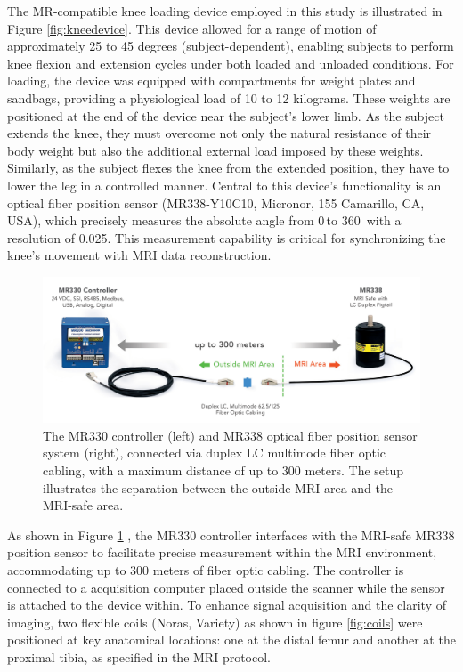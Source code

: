 \documentclass{micro-econ-thesis}
\begin{document}
The MR-compatible knee loading device employed in this study is illustrated in Figure \ref{fig:kneedevice}. This device allowed for a range of motion of approximately 25 to 45 degrees (subject-dependent), enabling subjects to perform knee flexion and extension cycles under both loaded and unloaded conditions. For loading, the device was equipped with compartments for weight plates and sandbags, providing a physiological load of 10 to 12 kilograms. These weights are positioned at the end of the device near the subject's lower limb. As the subject extends the knee, they must overcome not only the natural resistance of their body weight but also the additional external load imposed by these weights. Similarly, as the subject flexes the knee from the extended position, they have to lower the leg in a controlled manner. Central to this device's functionality is an optical fiber position sensor (MR338-Y10C10, Micronor, 155 Camarillo, CA, USA), which precisely  measures the ab­solute angle from 0{\degree}\,to 360\degree \, with a resolution of 0.025\degree \parencite{rickenbach_optical_2013}. This measurement capability is critical for synchronizing the knee's movement with MRI data reconstruction. 
\begin{figure} [H]
	\centering
	\includegraphics[width=0.7\linewidth]{sensor_img}
	\caption{The MR330 controller (left) and MR338 optical fiber position sensor system (right), connected via duplex LC multimode fiber optic cabling, with a maximum distance of up to 300 meters. The setup illustrates the separation between the outside MRI area and the MRI-safe area.}
	\label{fig:sensorimg}
\end{figure}


As shown in Figure \ref{fig:sensorimg} , the MR330 controller interfaces with the MRI-safe MR338 position sensor to facilitate precise measurement within the MRI environment, accommodating up to 300 meters of fiber optic cabling. The controller is connected to a acquisition computer placed outside the scanner while the sensor is attached to the device within. To enhance signal acquisition and the clarity of imaging, two flexible coils (Noras, Variety) as shown in figure \ref{fig:coils} were positioned at key anatomical locations: one at the distal femur and another at the proximal tibia, as specified in the MRI protocol. 
\end{document}
